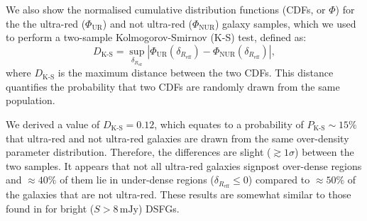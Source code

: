 \documentclass[a4paper, fleqn, usenatbib]{mnras}
\newcommand{\millijanksy}{\text{mJy}}
\newcommand{\reff}{R_{\text{eff}}}
\newcommand{\urgs}{ultra-red galaxies}
\begin{document}
We also show the normalised cumulative distribution functions (CDFs, or $\Phi$) for the the ultra-red ($\Phi_{\text{UR}}$) and not ultra-red ($\Phi_{\text{NUR}}$) galaxy samples, which we used to perform a two-sample Kolmogorov-Smirnov (K-S) test, defined as:
\begin{equation}
    \label{eq:ks_test}
    D_{\text{K-S}}=\sup_{\delta_{\reff{}}}|\Phi_{\text{UR}}\left(\delta_{\reff{}}\right)-\Phi_{\text{NUR}}\left(\delta_{\reff{}}\right)|,
\end{equation}
where $D_{\text{K-S}}$ is the maximum distance between the two CDFs.
This distance quantifies the probability that two CDFs are randomly drawn from the same population.

We derived a value of $D_{\text{K-S}}=0.12$, which equates to a probability of $P_{\text{K-S}}\sim15\%$ that ultra-red and not ultra-red galaxies are drawn from the same over-density parameter distribution.
Therefore, the differences are slight ($\gtrsim1\sigma$) between the two samples.
It appears that not all \urgs{} signpost over-dense regions and $\approx40\%$ of them lie in under-dense regions ($\delta_{\reff{}}\le0$) compared to $\approx50\%$ of the galaxies that are not ultra-red.
These results are somewhat similar to those found in  for bright ($S>8\,\millijanksy{}$) DSFGs.
\end{document}

